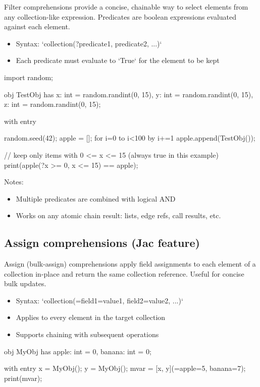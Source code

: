 Filter comprehensions provide a concise, chainable way to select elements from any collection-like expression. Predicates are boolean expressions evaluated against each element.

\begin{itemize}
    \item Syntax: `collection(?predicate1, predicate2, ...)`
    \item Each predicate must evaluate to `True` for the element to be kept
\end{itemize}

\begin{jacblock}
import random;

obj TestObj {
    has x: int = random.randint(0, 15),
        y: int = random.randint(0, 15),
        z: int = random.randint(0, 15);
}

with entry {
    random.seed(42);
    apple = [];
    for i=0 to i<100 by i+=1  {
        apple.append(TestObj());
    }

    // keep only items with 0 <= x <= 15 (always true in this example)
    print(apple(?x >= 0, x <= 15) == apple);
}
\end{jacblock}

Notes:
\begin{itemize}
    \item Multiple predicates are combined with logical AND
    \item Works on any atomic chain result: lists, edge refs, call results, etc.
\end{itemize}

\subsection{Assign comprehensions (Jac feature)}

Assign (bulk-assign) comprehensions apply field assignments to each element of a collection in-place and return the same collection reference. Useful for concise bulk updates.

\begin{itemize}
    \item Syntax: `collection(=field1=value1, field2=value2, ...)`
    \item Applies to every element in the target collection
    \item Supports chaining with subsequent operations
\end{itemize}

\begin{jacblock}
obj MyObj {
    has apple: int = 0,
        banana: int = 0;
}

with entry {
    x = MyObj();
    y = MyObj();
    mvar = [x, y](=apple=5, banana=7);
    print(mvar);
}
\end{jacblock}

